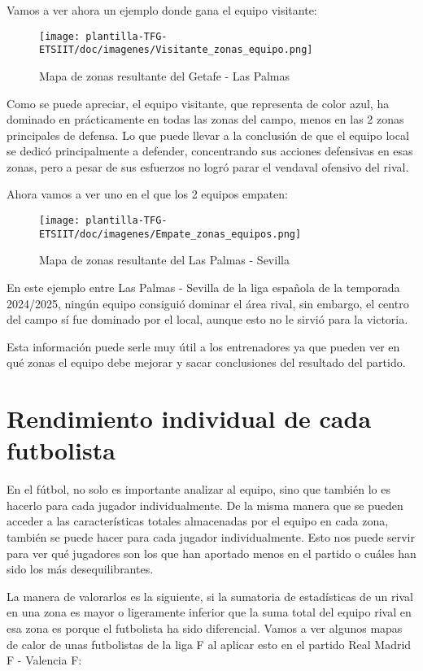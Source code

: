 Vamos a ver ahora un ejemplo donde gana el equipo visitante:

\begin{figure}[H]
    \centering
    \texttt{[image: plantilla-TFG-ETSIIT/doc/imagenes/Visitante\_zonas\_equipo.png]}
    \caption{Mapa de zonas resultante del Getafe - Las Palmas}
    \label{fig:etiqueta-imagen}
\end{figure}

Como se puede apreciar, el equipo visitante, que representa de color azul, ha dominado en prácticamente en todas las zonas del campo, menos en las 2 zonas principales de defensa. Lo que puede llevar a la conclusión de que el equipo local se dedicó principalmente a defender, concentrando sus acciones defensivas en esas zonas, pero a pesar de sus esfuerzos no logró parar el vendaval ofensivo del rival.

Ahora vamos a ver uno en el que los 2 equipos empaten:
\begin{figure}[H]
    \centering
    \texttt{[image: plantilla-TFG-ETSIIT/doc/imagenes/Empate\_zonas\_equipos.png]}
    \caption{Mapa de zonas resultante del Las Palmas - Sevilla}
    \label{fig:etiqueta-imagen}
\end{figure}

En este ejemplo entre Las Palmas - Sevilla de la liga española de la temporada 2024/2025, ningún equipo consiguió dominar el área rival, sin embargo, el centro del campo sí fue dominado por el local, aunque esto no le sirvió para la victoria.

Esta información puede serle muy útil a los entrenadores ya que pueden ver en qué zonas el equipo debe mejorar y sacar conclusiones del resultado del partido.

\section{Rendimiento individual de cada futbolista}
En el fútbol, no solo es importante analizar al equipo, sino que también lo es hacerlo para cada jugador individualmente. De la misma manera que se pueden acceder a las características totales almacenadas por el equipo en cada zona, también se puede hacer para cada jugador individualmente. Esto nos puede servir para ver qué jugadores son los que han aportado menos en el partido o cuáles han sido los más desequilibrantes.

La manera de valorarlos es la siguiente, si la sumatoria de estadísticas de un rival en una zona es mayor o ligeramente inferior que la suma total del equipo rival en esa zona es porque el futbolista ha sido diferencial.
Vamos a ver algunos mapas de calor de unas futbolistas de la liga F al aplicar esto en el partido
Real Madrid F - Valencia F:

